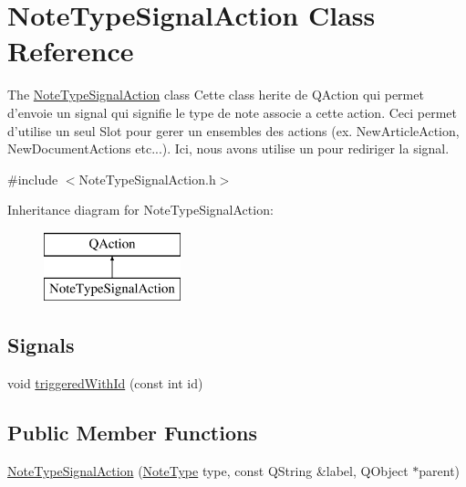 \hypertarget{class_note_type_signal_action}{\section{Note\-Type\-Signal\-Action Class Reference}
\label{class_note_type_signal_action}
}


The \hyperlink{class_note_type_signal_action}{Note\-Type\-Signal\-Action} class Cette class herite de Q\-Action qui permet d'envoie un signal qui signifie le type de note associe a cette action. Ceci permet d'utilise un seul Slot pour gerer un ensembles des actions (ex. New\-Article\-Action, New\-Document\-Actions etc...). Ici, nous avons utilise un  pour rediriger la signal.  




{\ttfamily \#include $<$Note\-Type\-Signal\-Action.\-h$>$}

Inheritance diagram for Note\-Type\-Signal\-Action\-:\begin{figure}[H]
\begin{center}
\leavevmode
\includegraphics[height=2.000000cm]{class_note_type_signal_action}
\end{center}
\end{figure}
\subsection*{Signals}
\begin{DoxyCompactItemize}
\item 
void \hyperlink{class_note_type_signal_action_afce066fca998b99e9073599ea9ec20b7}{triggered\-With\-Id} (const int id)
\end{DoxyCompactItemize}
\subsection*{Public Member Functions}
\begin{DoxyCompactItemize}
\item 
\hyperlink{class_note_type_signal_action_a38a8f0ee2bfa53dcc289a1a73a97e920}{Note\-Type\-Signal\-Action} (\hyperlink{_note_factory_8h_a0e0de7dc7864c9c2e738e017dce974be}{Note\-Type} type, const Q\-String \&label, Q\-Object $\ast$parent)
\end{DoxyCompactItemize}



